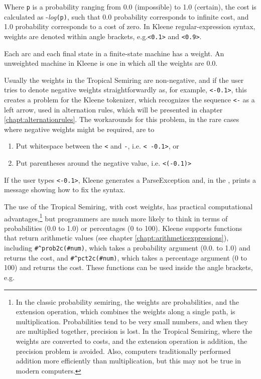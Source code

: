 \noindent
Where \texttt{p} is a probability ranging from 0.0 (impossible) to
1.0 (certain), the cost is calculated as -\emph{log}\texttt{(p)},
such that 0.0 probability corresponds to infinite cost, and 1.0
probability corresponds to a cost of zero.
In Kleene regular-expression syntax, weights are denoted within angle brackets,
e.g.\@ \texttt{<0.1>} and \texttt{<0.9>}. 

Each arc and each final state in a finite-state machine has a weight.  An unweighted
machine in Kleene is one in which all the weights are 0.0.

Usually the weights in
the Tropical Semiring are non-negative, and if the user tries to
denote negative weights straightforwardly as, for example, \@ \texttt{<-0.1>}, this
creates a problem for the Kleene tokenizer, which recognizes the
sequence \texttt{<-} as a left arrow, used in alternation rules, which
will be presented in chapter \ref{chapt:alternationrules}.
The workarounds for this problem, in the rare cases where negative
weights might be required,
are to

\begin{enumerate}
\item
Put whitespace between the \texttt{<} and \texttt{-}, i.e.\@
\texttt{< -0.1>}, or
\item
Put parentheses around the negative value, i.e.\@
\texttt{<(-0.1)>}
\end{enumerate}

\noindent
If the user types \texttt{<-0.1>}, Kleene generates a
ParseException and, in the , prints a message showing how
to fix the syntax.

The use of the Tropical Semiring, with cost weights, has practical computational
advantages,\footnote{In the classic probability semiring, the weights are probabilities, and the extension
operation, which combines the weights along a single path, is multiplication.  Probabilities tend to be very small numbers, and when they are multiplied
together, precision is lost.  In the Tropical Semiring, where the weights are converted to costs, and the
extension operation is addition, the precision problem is avoided.  Also, computers traditionally
performed addition more efficiently than multiplication, but this may not be true in modern computers.} but programmers are much more likely to think in terms of
probabilities (0.0 to 1.0) or percentages (0 to 100).  Kleene supports functions that return arithmetic
values (see chapter \ref{chapt:arithmeticexpressions}), including \verb!#^prob2c(#num)!, which takes a probability
argument (0.0. to 1.0) and returns the cost, and \verb!#^pct2c(#num)!, which takes a percentage argument
(0 to 100) and returns the cost.  These functions can be used inside the angle brackets, e.g.


